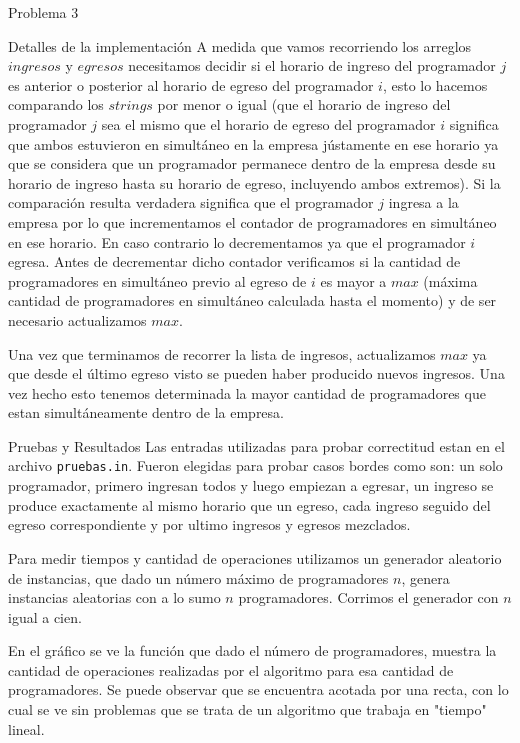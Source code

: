\begin{section}{Problema 3}
\begin{subsection}{Detalles de la implementación}
	A medida que vamos recorriendo los arreglos $ingresos$ y $egresos$ necesitamos decidir si el horario de ingreso del programador $j$ es anterior o posterior al horario de egreso del programador $i$, esto lo hacemos comparando los $strings$ por menor o igual (que el horario de ingreso del programador $j$ sea el mismo que el horario de egreso del programador $i$ significa que ambos estuvieron en simultáneo en la empresa jústamente en ese horario ya que se considera que un programador permanece dentro de la empresa desde su horario de ingreso hasta su horario de egreso, incluyendo ambos extremos). Si la comparación resulta verdadera significa que el programador $j$ ingresa a la empresa por lo que incrementamos el contador de programadores en simultáneo en ese horario. En caso contrario lo decrementamos ya que el programador $i$ egresa. Antes de decrementar dicho contador verificamos si la cantidad de programadores en simultáneo previo al egreso de $i$ es mayor a $max$ (máxima cantidad de programadores en simultáneo calculada hasta el momento) y de ser necesario actualizamos $max$.

	Una vez que terminamos de recorrer la lista de ingresos, actualizamos $max$ ya que desde el último egreso visto se pueden haber producido nuevos ingresos. Una vez hecho esto tenemos determinada la mayor cantidad de programadores que estan simultáneamente dentro de la empresa.
	\end{subsection}

	\begin{subsection}{Pruebas y Resultados}
	Las entradas utilizadas para probar correctitud estan en el archivo \texttt{pruebas.in}. Fueron elegidas para probar casos bordes como son: un solo programador, primero ingresan todos y luego empiezan a egresar, un ingreso se produce exactamente al mismo horario que un egreso, cada ingreso seguido del egreso correspondiente y por ultimo ingresos y egresos mezclados.

	Para medir tiempos y cantidad de operaciones utilizamos un generador aleatorio de instancias, que dado un número máximo de programadores $n$, genera instancias aleatorias con a lo sumo $n$ programadores. Corrimos el generador con $n$ igual a cien.
		
	\VSP

	En el gráfico se ve la función que dado el número de programadores, muestra la cantidad de operaciones realizadas por el algoritmo para esa cantidad de programadores. Se puede observar que se encuentra acotada por una recta, con lo cual se ve sin problemas que se trata de un algoritmo que trabaja en "tiempo" lineal.
	

\end{subsection}
\end{section}
